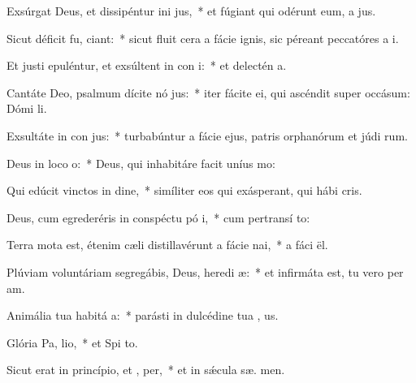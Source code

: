 \item Exsúrgat Deus, et dissipéntur ini jus,~* et fúgiant qui odérunt eum, a  jus.
\item Sicut déficit fu, ciant:~* sicut fluit cera a fácie ignis, sic péreant peccatóres a  i.
\item Et justi epuléntur, et exsúltent in con i:~* et delectén  a.
\item Cantáte Deo, psalmum dícite nó jus:~* iter fácite ei, qui ascéndit super occásum: Dómi  li.
\item Exsultáte in con jus:~* turbabúntur a fácie ejus, patris orphanórum et júdi rum.
\item Deus in loco  o:~* Deus, qui inhabitáre facit uníus   mo:
\item Qui edúcit vinctos in dine,~* simíliter eos qui exásperant, qui hábi  cris.
\item Deus, cum egrederéris in conspéctu pó i,~* cum pertransí  to:
\item Terra mota est, étenim cæli distillavérunt a fácie  nai,~* a fáci  ël.
\item Plúviam voluntáriam segregábis, Deus, heredi æ:~* et infirmáta est, tu vero per am.
\item Animália tua habitá  a:~* parásti in dulcédine tua , us.
\item Glória Pa,  lio,~* et Spi to.
\item Sicut erat in princípio, et ,  per,~* et in sǽcula sæ. men.
